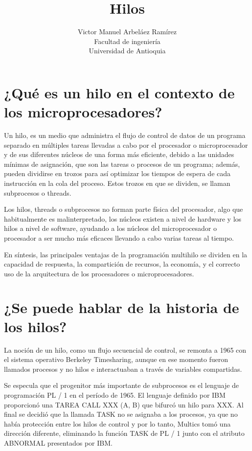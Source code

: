 \documentclass[12pt, letter]{article}
\title{\huge{Hilos}}
\author{Victor Manuel Arbeláez Ramírez \\ Facultad de ingeniería \\ Universidad de Antioquia}
\date{}
\begin{document}
\raggedright

\maketitle

\section*{¿Qué es un hilo en el contexto de los microprocesadores?}

\setlength{\parindent}{31pt}
Un hilo, es un medio que administra el flujo de control de datos de un programa separado en múltiples tareas llevadas a cabo por el procesador o microprocesador y de sus diferentes núcleos de una forma más eficiente, debido a las unidades mínimas de asignación, que son las tareas o procesos de un programa; además, pueden dividirse en trozos para así optimizar los tiempos de espera de cada instrucción en la cola del proceso. Estos trozos en que se dividen, se llaman subprocesos o threads.

\setlength{\parindent}{31pt}
Los hilos, threads o subprocesos no forman parte física del procesador, algo que habitualmente es malinterpretado, los núcleos existen a nivel de hardware y los hilos a nivel de software, ayudando a los núcleos del microprocesador o procesador a ser mucho más eficaces llevando a cabo varias tareas al tiempo.

\setlength{\parindent}{31pt}
En síntesis, las principales ventajas de la programación multihilo se dividen en la capacidad de respuesta, la compartición de recursos, la economía, y el correcto uso de la arquitectura de los procesadores o microprocesadores.

\section*{¿Se puede hablar de la historia de los hilos?}

\setlength{\parindent}{31pt}
La noción de un hilo, como un flujo secuencial de control, se remonta a 1965 con el sistema operativo Berkeley Timesharing, aunque en ese momento fueron llamados procesos y no hilos e interactuaban a través de variables compartidas.

\setlength{\parindent}{31pt}
Se especula que el progenitor más importante de subprocesos es el lenguaje de programación PL / 1 en el período de 1965. El lenguaje definido por IBM proporcionó una TAREA CALL XXX (A, B) que bifurcó un hilo para XXX. Al final se decidió que la llamada TASK no se asignaba a los procesos, ya que no había protección entre los hilos de control y por lo tanto, Multics tomó una dirección diferente, eliminando la función TASK de PL / 1 junto con el atributo ABNORMAL presentados por IBM.
\end{document}
